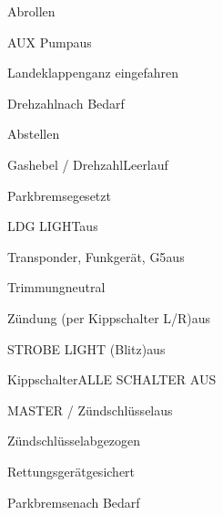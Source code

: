 \begin{checklist}{Abrollen}
	\item{AUX Pump}{aus}
	\item{Landeklappen}{ganz eingefahren}
	\item{Drehzahl}{nach Bedarf}
\end{checklist}

\begin{checklist}{Abstellen}
	  \item{Gashebel / Drehzahl}{Leerlauf}
	  \item{Parkbremse}{gesetzt}
	  \item{LDG LIGHT}{aus}
	  \item{Transponder, Funkgerät, G5}{aus}
	  \item{Trimmung}{neutral}
	  \item{Zündung (per Kippschalter L/R)}{aus}
	  
	\item{STROBE LIGHT (Blitz)}{aus}
	\item{Kippschalter}{ALLE SCHALTER AUS}
	\item{MASTER / Zündschlüssel}{aus}
	\item{Zündschlüssel}{abgezogen}
	\item{Rettungsgerät}{gesichert}
    	  
	  \item{Parkbremse}{nach Bedarf}
\end{checklist}


